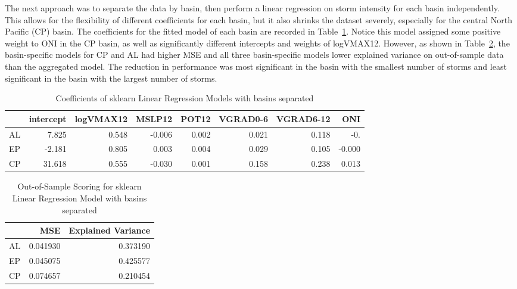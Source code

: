 \documentclass[12pt]{article}
\begin{document}
The next approach was to separate the data by basin, then perform a linear regression on storm intensity for each basin independently. This allows for the flexibility of different coefficients for each basin, but it also shrinks the dataset severely, especially for the central North Pacific (CP) basin. The coefficients for the fitted model of each basin are recorded in Table~\ref{tab:basin_reg_coefs}. Notice this model assigned some positive weight to ONI in the CP basin, as well as significantly different intercepts and weights of logVMAX12. However, as shown in Table~\ref{tab:basin_reg_scoring}, the basin-specific models for CP and AL had higher MSE and all three basin-specific models lower explained variance on out-of-sample data than the aggregated model. The reduction in performance was most significant in the basin with the smallest number of storms and least significant in the basin with the largest number of storms. 

\begin{table}[h]
\centering
\caption{Coefficients of sklearn Linear Regression Models with basins separated}
\label{tab:basin_reg_coefs}
\begin{tabular}{lrrrrrrr}
\toprule
 & intercept & logVMAX12 & MSLP12 & POT12 & VGRAD0-6 & VGRAD6-12 & ONI \\
\midrule
AL & 7.825 & 0.548 & -0.006 & 0.002 & 0.021 & 0.118 & -0. \\
EP & -2.181 & 0.805 & 0.003 & 0.004 & 0.029 & 0.105 & -0.000 \\
CP & 31.618 & 0.555 & -0.030 & 0.001 & 0.158 & 0.238 & 0.013 \\
\bottomrule
\end{tabular}
\end{table}

\begin{table}[h]
\centering
\caption{Out-of-Sample Scoring for sklearn Linear Regression Model with basins separated}
\label{tab:basin_reg_scoring}
\begin{tabular}{lrr}
\toprule
 & MSE & Explained Variance \\
\midrule
AL & 0.041930 & 0.373190 \\
EP & 0.045075 & 0.425577 \\
CP & 0.074657 & 0.210454 \\
\bottomrule
\end{tabular}
\end{table}
\end{document}
